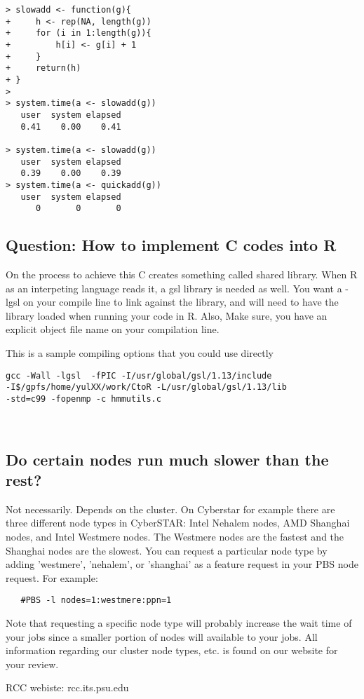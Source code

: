 \documentclass[12pt]{article}
\begin{document}
\begin{lstlisting}[label= timing ,caption= system.time command in R]                          
> slowadd <- function(g){
+     h <- rep(NA, length(g))
+     for (i in 1:length(g)){
+         h[i] <- g[i] + 1
+     }
+     return(h)
+ }
> 
> system.time(a <- slowadd(g))
   user  system elapsed 
   0.41    0.00    0.41 

> system.time(a <- slowadd(g))
   user  system elapsed 
   0.39    0.00    0.39 
> system.time(a <- quickadd(g))
   user  system elapsed 
      0       0       0 
\end{lstlisting}

\subsection{Question: How to implement C codes into R}
 On the process to achieve this C creates something called shared library. When R as an interpeting language reads it, a gsl library is needed as well.
You want a -lgsl on your compile line to link against the library, and will need to have the library loaded when running your code in R. Also, Make sure, you have an explicit object file name on your compilation line. 

This is a sample compiling options that you could use directly 
\begin{verbatim}
gcc -Wall -lgsl  -fPIC -I/usr/global/gsl/1.13/include 
-I$/gpfs/home/yulXX/work/CtoR -L/usr/global/gsl/1.13/lib
-std=c99 -fopenmp -c hmmutils.c 
\end{verbatim}
 

 
\subsection{Do certain nodes run much slower than the rest?}

Not necessarily. Depends on the cluster. On Cyberstar for example there are three different node types in CyberSTAR: Intel Nehalem nodes,
AMD Shanghai nodes, and Intel Westmere nodes.  The Westmere nodes are
the fastest and the Shanghai nodes are the slowest.  You can request a
particular node type by adding 'westmere', 'nehalem', or 'shanghai' as a
feature request in your PBS node request.  For example:
\begin{verbatim}
   #PBS -l nodes=1:westmere:ppn=1
\end{verbatim}
Note that requesting a specific node type will probably increase the
wait time of your jobs since a smaller portion of nodes will available
to your jobs. All information regarding our cluster node types, etc. is found on our website for your review.\\

 



\begin{thebibliography}{}

\bibitem{}
RCC webiste: rcc.its.psu.edu

\end{thebibliography}

 
\end{document}
